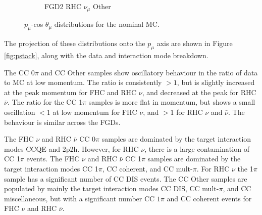 \begin{figure}
\begin{subfigure}{.32\textwidth}
  \caption{FGD2 RHC $\nu_{\mu}$ Other}
  \label{fig:2d_FGD2_NuMuBkg_CCOther_in_AntiNu_Mode}
\end{subfigure}
\caption{$p_{\mu}$-cos $\theta_{\mu}$ distributions for the nominal MC.}
\label{fig:2dnom}
\end{figure}

The projection of these distributions onto the $p_{\mu}$ axis are shown in Figure \ref{fig:pstack}, along with the data and interaction mode breakdown.

The CC 0$\pi$ and CC Other samples show oscillatory behaviour in the ratio of data to MC at low momentum. The ratio is consistently $>1$, but is slightly increased at the peak momentum for FHC and RHC $\nu$, and decreased at the peak for RHC $\bar{\nu}$. The ratio for the CC 1$\pi$ samples is more flat in momentum, but shows a small oscillation $<1$ at low momentum for FHC $\nu$, and $>1$ for RHC $\nu$ and $\bar{\nu}$. The behaviour is similar across the FGDs.

The FHC $\nu$ and RHC $\bar{\nu}$ CC 0$\pi$ samples are dominated by the target interaction modes CCQE and 2p2h. However, for RHC $\nu$, there is a large contamination of CC 1$\pi$ events. The FHC $\nu$ and RHC $\bar{\nu}$ CC 1$\pi$ samples are dominated by the target interaction modes CC 1$\pi$, CC coherent, and CC mult-$\pi$. For RHC $\nu$ the 1$\pi$ sample has a significant number of CC DIS events. The CC Other samples are populated by mainly the target interaction modes CC DIS, CC mult-$\pi$, and CC miscellaneous, but with a significant number CC $1\pi$ and CC coherent events for FHC $\nu$ and RHC $\bar{\nu}$.

